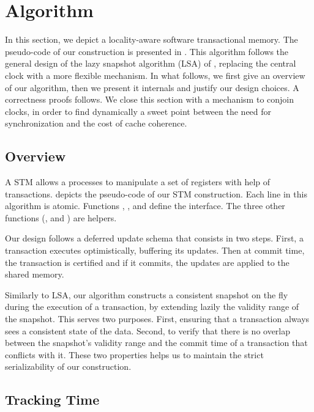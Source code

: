 \section{Algorithm}

In this section, we depict a locality-aware software transactional memory.
The pseudo-code of our construction is presented in .
This algorithm follows the general design of the lazy snapshot algorithm (LSA) of \citet{FelberFMR10}, replacing the central clock with a more flexible mechanism.
In what follows, we first give an overview of our algorithm, then we present it internals and justify our design choices.
A correctness proofs follows.
We close this section with a mechanism to conjoin clocks,
in order to find dynamically a sweet point between the need for synchronization and the cost of cache coherence.

\subsection{Overview}

A STM allows a processes to manipulate a set of registers with help of transactions.
 depicts the pseudo-code of our STM construction.
Each line in this algorithm is atomic.
Functions \stmStartFunction, \stmReadFunction, \stmWriteFunction and \stmTryCommitFunction define the interface.
The three other functions (\stmExtendFunction, \stmCommitFunction and \stmAbortFunction) are helpers.

Our design follows a deferred update schema that consists in two steps.
First, a transaction executes optimistically, buffering its updates.
Then at commit time, the transaction is certified and if it commits, the updates are applied to the shared memory.

Similarly to LSA, our algorithm constructs a consistent snapshot on the fly during the execution of a transaction,
by extending lazily the validity range of the snapshot.
This serves two purposes.
First, ensuring that a transaction always sees a consistent state of the data. 
Second, to verify that there is no overlap between the snapshot's validity range
and the commit time of a transaction that conflicts with it.
These two properties helps us to maintain the strict serializability of our construction.

\subsection{Tracking Time}

